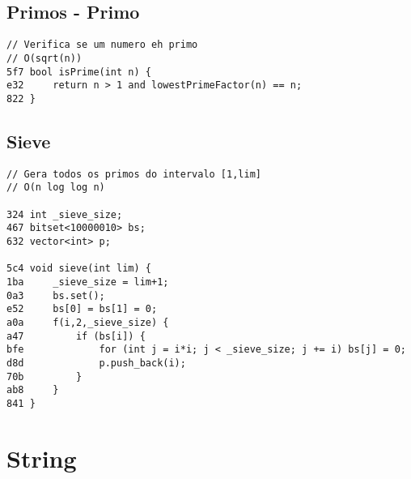 \documentclass[11pt, a4paper, twoside]{article}
\begin{document}
\subsection{Primos - Primo}
\begin{lstlisting}
// Verifica se um numero eh primo
// O(sqrt(n))
5f7 bool isPrime(int n) {
e32     return n > 1 and lowestPrimeFactor(n) == n;
822 }
\end{lstlisting}

\subsection{Sieve}
\begin{lstlisting}
// Gera todos os primos do intervalo [1,lim]
// O(n log log n)

324 int _sieve_size;
467 bitset<10000010> bs;
632 vector<int> p;

5c4 void sieve(int lim) {
1ba     _sieve_size = lim+1;
0a3     bs.set();
e52     bs[0] = bs[1] = 0;
a0a     f(i,2,_sieve_size) { 
a47         if (bs[i]) {
bfe             for (int j = i*i; j < _sieve_size; j += i) bs[j] = 0;
d8d             p.push_back(i);
70b         }
ab8     }
841 }
\end{lstlisting}



%
%

\section{String}
\end{document}
